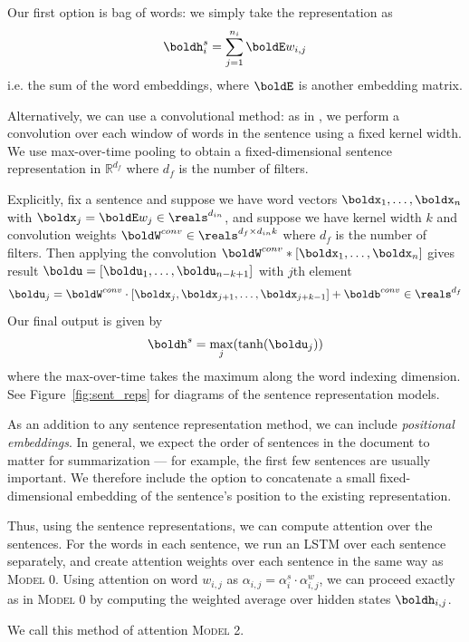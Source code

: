\documentclass[12pt]{report}
\begin{document}
Our first option is bag of words: we simply take the representation as
\begin{equation}
\boldh_i^s = \sum_{j=1}^{n_i} \boldE w_{i,j}
\end{equation}
i.e. the sum of the word embeddings, where $\boldE$ is another embedding matrix.

Alternatively, we can use a convolutional method: as in \citet{kim2014convolutional}, we perform a convolution over each window of words in the sentence using a fixed kernel width. We use max-over-time pooling to obtain a fixed-dimensional sentence representation in $\mathbb{R}^{d_f}$ where $d_f$ is the number of filters.

Explicitly, fix a sentence and suppose we have word vectors $\boldx_1, \ldots, \boldx_n$ with $\boldx_j = \boldE w_j \in \reals^{d_{in}}$, and suppose we have kernel width $k$ and convolution weights $\boldW^{conv} \in \reals^{d_f \times d_{in} k}$ where $d_f$ is the number of filters. Then applying the convolution
$\boldW^{conv} * [\boldx_1, \ldots, \boldx_n]$ gives result $\boldu = [\boldu_1, \ldots, \boldu_{n-k+1}]$ with $j$th element
$$\boldu_j = \boldW^{conv} \cdot [\boldx_j, \boldx_{j+1}, \ldots, \boldx_{j+k-1}] + \boldb^{conv} \in \reals^{d_f}$$
Our final output is given by 
\begin{equation}
\boldh^s = \max_j(\tanh(\boldu_j))
\end{equation}
where the max-over-time takes the maximum along the word indexing dimension. See Figure~\ref{fig:sent_reps} for diagrams of the sentence representation models.

As an addition to any sentence representation method, we can include \emph{positional embeddings}. In general, we expect the order of sentences in the document to matter for summarization --- for example, the first few sentences are usually important.
We therefore include the option to concatenate a small fixed-dimensional embedding of the sentence's position to the existing representation.

Thus, using the sentence representations, we can compute attention over the sentences.
For the words in each sentence, we run an LSTM over each sentence separately, and create attention weights over each sentence in the same way as \textsc{Model 0}. Using attention on word $w_{i,j}$ as  $\alpha_{i,j} = \alpha_i^s \cdot \alpha_{i,j}^w$, we can proceed exactly as in \textsc{Model 0} by computing the weighted average over hidden states $\boldh_{i,j}$.

We call this method of attention \textsc{Model 2}.
\end{document}
